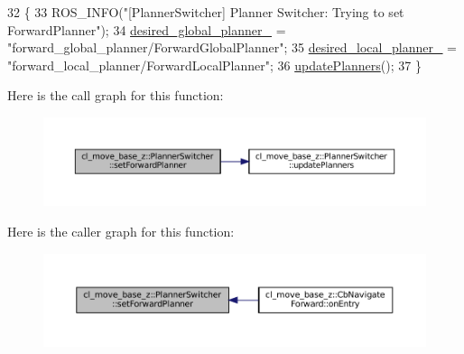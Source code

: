 \begin{DoxyCode}
32 \{
33   ROS\_INFO(\textcolor{stringliteral}{"[PlannerSwitcher] Planner Switcher: Trying to set ForwardPlanner"});
34   \hyperlink{classcl__move__base__z_1_1PlannerSwitcher_aef047d3778b2993c1df146bbad43e03d}{desired\_global\_planner\_} = \textcolor{stringliteral}{"forward\_global\_planner/ForwardGlobalPlanner"};
35   \hyperlink{classcl__move__base__z_1_1PlannerSwitcher_a6cbf65f11bb69125f913caaabdf7b4cf}{desired\_local\_planner\_} = \textcolor{stringliteral}{"forward\_local\_planner/ForwardLocalPlanner"};
36   \hyperlink{classcl__move__base__z_1_1PlannerSwitcher_a146641f63aea3185daab4c5cbb789550}{updatePlanners}();
37 \}
\end{DoxyCode}
Here is the call graph for this function\+:
\nopagebreak
\begin{figure}[H]
\begin{center}
\leavevmode
\includegraphics[width=350pt]{classcl__move__base__z_1_1PlannerSwitcher_a4bec9859c90f125f9fcc2b68594caf17_cgraph}
\end{center}
\end{figure}
Here is the caller graph for this function\+:
\nopagebreak
\begin{figure}[H]
\begin{center}
\leavevmode
\includegraphics[width=350pt]{classcl__move__base__z_1_1PlannerSwitcher_a4bec9859c90f125f9fcc2b68594caf17_icgraph}
\end{center}
\end{figure}
\mbox{\label{classcl__move__base__z_1_1PlannerSwitcher_a146641f63aea3185daab4c5cbb789550}} 
